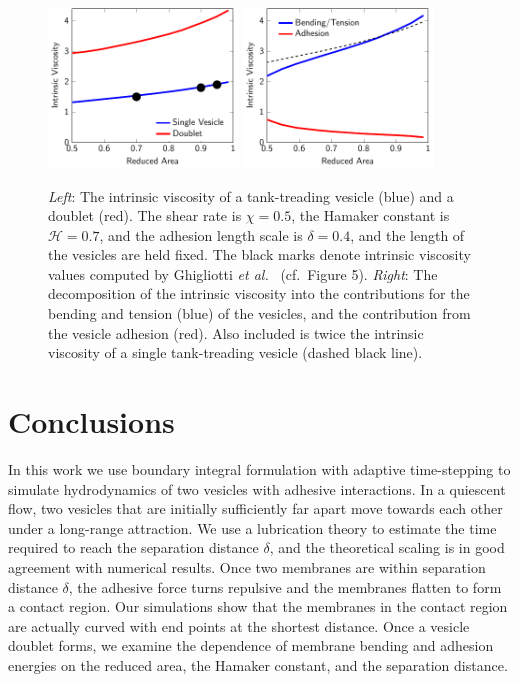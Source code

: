 \documentclass[prf,superscriptaddress,showpacs]{revtex4-1}
\begin{document}
\begin{figure}[htp]
  \centering
  \includegraphics[width=0.45\textwidth]{figs/shear2Ves_adR4em1adS7em1Chi5em1.pdf}
  \includegraphics[width=0.45\textwidth]{figs/doublet_decomp.pdf}
  \caption{\label{fig:shearIntrinsicViscosity} {\em Left}: The intrinsic
  viscosity of a tank-treading vesicle (blue) and a doublet (red).  The
  shear rate is $\chi = 0.5$, the Hamaker constant is $\mathcal{H} =
  0.7$, and the adhesion length scale is $\delta = 0.4$, and the length
  of the vesicles are held fixed.  The black marks denote intrinsic
  viscosity values computed by Ghigliotti {\em et
  al.}~\cite{GhigliottiBibenMisbah2010_JFM} (cf.~Figure 5).  {\em
  Right}: The decomposition of the intrinsic viscosity into the
  contributions for the bending and tension (blue) of the vesicles, and
  the contribution from the vesicle adhesion (red).  Also included is
  twice the intrinsic viscosity of a single tank-treading vesicle
  (dashed black line).}
\end{figure}



\section{Conclusions\label{sec:conclusions}}
In this work we use boundary integral formulation with adaptive
time-stepping to simulate hydrodynamics of two vesicles with adhesive
interactions.  In a quiescent flow, two vesicles that are initially
sufficiently far apart move towards each other under a long-range
attraction.  We use a lubrication theory to estimate the time required
to reach the separation distance $\delta$, and the theoretical scaling is in good
agreement with numerical results.  Once two membranes are within
separation distance $\delta$, the adhesive force turns repulsive and the
membranes flatten to form a contact region.  Our simulations show that
the membranes in the contact region are actually curved with end points
at the shortest distance.  Once a vesicle doublet forms, we examine the
dependence of membrane bending and adhesion energies on the reduced
area, the Hamaker constant, and the separation distance.
\end{document}
